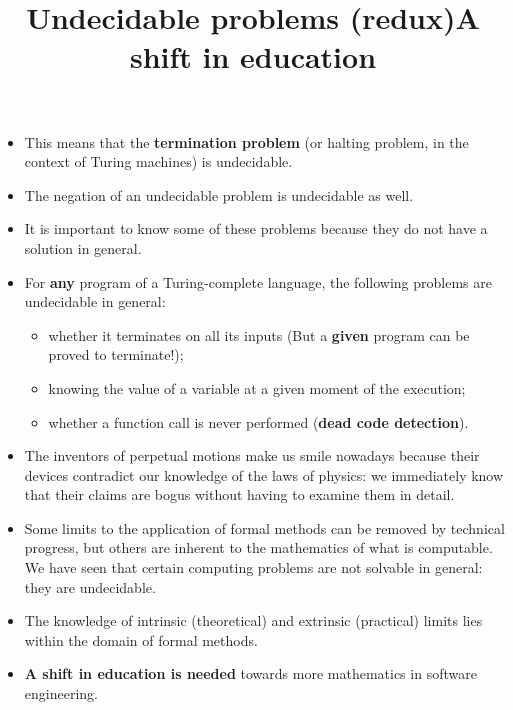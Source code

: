 \documentclass[wide]{slides}
\begin{document}
\begin{slide}
  \title{Undecidable problems (redux)}

  \begin{itemize}

    \item This means that the \textbf{termination problem} (or halting
      problem, in the context of Turing machines) is undecidable.

    \item The negation of an undecidable problem is undecidable as
      well.

    \item It is important to know some of these problems because they
      do not have a solution in general.

    \item For \textbf{any} program of a Turing-complete language, the
      following problems are undecidable in general:
      \begin{itemize}

        \item whether it terminates on all its inputs (But a
          \textbf{given} program can be proved to terminate!);

        \item knowing the value of a variable at a given moment of the
          execution;

        \item whether a function call is never performed (\textbf{dead
          code detection}).

      \end{itemize}
  \end{itemize}

\end{slide}

\begin{slide}
  \title{A shift in education}

  \begin{itemize}

    \item The inventors of perpetual motions make us smile nowadays
      because their devices contradict our knowledge of the laws of
      physics: we immediately know that their claims are bogus without
      having to examine them in detail.

    \item Some limits to the application of formal methods can be
      removed by technical progress, but others are inherent to the
      mathematics of what is computable. We have seen that certain
      computing problems are not solvable in general: they are
      undecidable.

    \item The knowledge of intrinsic (theoretical) and extrinsic
      (practical) limits lies within the domain of formal methods.

    \item \textbf{A shift in education is needed} towards more
      mathematics in software engineering.

\end{itemize}

\end{slide}
\end{document}
